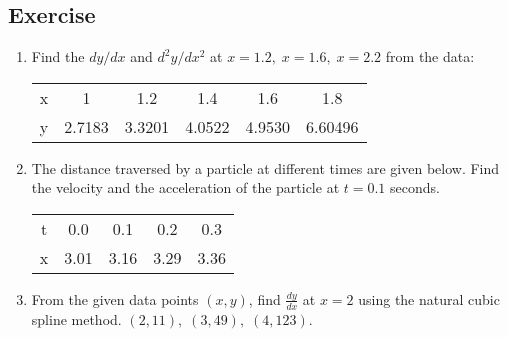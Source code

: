 \documentclass[aima203_lecturenotes_ku.tex]{subfiles}
\begin{document}
\subsection{Exercise}
\begin{enumerate}
\item Find the $dy/dx$ and $d^2y/dx^2$ at $x=1.2, \; x=1.6, \; x=2.2$ from the data:
  \begin{table}[h]
    \centering
    \begin{tabular}{|c|c|c|c|c|c|}
      \hline
      x& 1& 1.2& 1.4& 1.6&1.8\\
      y &2.7183& 3.3201& 4.0522& 4.9530& 6.60496\\
      \hline
    \end{tabular}
  \end{table}

\item The distance traversed by a particle at different times are given below. Find the velocity and the acceleration of the particle at $t=0.1$ seconds.
  \begin{table}[h]
    \centering
    \begin{tabular}{|c|c|c|c|c|}
      \hline
      t& 0.0& 0.1& 0.2& 0.3\\
      x & 3.01 & 3.16& 3.29& 3.36\\
      \hline
    \end{tabular}
  \end{table}

\item From the given data points $(x,y)$, find $\displaystyle \frac{dy}{dx}$ at $x=2$ using the natural cubic spline method.
$(2,11), \; (3,49), \; (4,123)$.
\end{enumerate}
\end{document}
